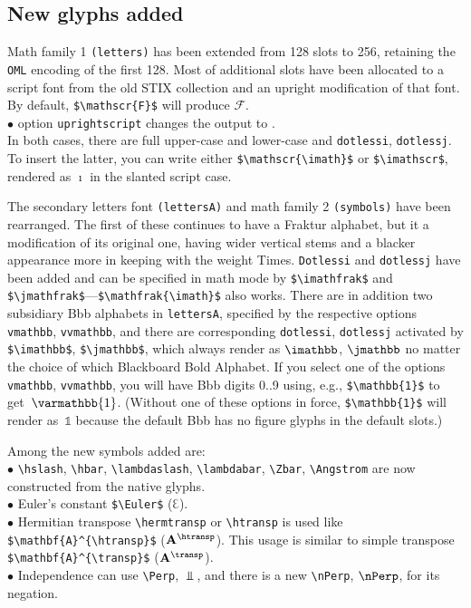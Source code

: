 \documentclass[11pt]{article}
\theoremstyle{oldplain}
\theoremstyle{plain}
\begin{document}
\subsection{New glyphs added}  Math family 1 {\tt (letters)} has been extended from 128 slots to 256, retaining the {\tt OML} encoding of the first 128. Most of additional slots have been allocated to a script font from the old STIX collection and an upright modification of that font.
By default, \verb|$\mathscr{F}$| will produce $\mathscr{F}$.\\
$\bullet$ option {\tt uprightscript} changes the output to {}.\\
In both cases, there are full upper-case and lower-case and {\tt dotlessi}, {\tt dotlessj}. To insert the latter, you can write either \verb|$\mathscr{\imath}$| or \verb|$\imathscr$|, rendered as $\mathscr{\imath}$ in the slanted script case.

The secondary letters font {\tt (lettersA)} and math family 2 {\tt(symbols)} have been rearranged. The first of these continues to have a Fraktur alphabet, but it a modification of its original one, having wider vertical stems and a blacker appearance more in keeping with the weight Times. {\tt Dotlessi} and {\tt dotlessj} have been added and can be specified in math mode by \verb|$\imathfrak$| and \verb|$\jmathfrak$|---\verb|$\mathfrak{\imath}$| also works. There are in addition two subsidiary Bbb alphabets in {\tt lettersA}, specified by the respective options {\tt vmathbb}, {\tt vvmathbb}, and there are corresponding {\tt dotlessi}, {\tt dotlessj} activated by \verb|$\imathbb$|, \verb|$\jmathbb$|, which always render as $\imathbb$, $\jmathbb$ no matter the choice of which Blackboard Bold Alphabet. If you select one of the options {\tt vmathbb}, {\tt vvmathbb}, you will have Bbb digits 0..9 using, e.g., \verb|$\mathbb{1}$| to get~$\varmathbb{1}$. (Without one of these options in force, \verb|$\mathbb{1}$| will render as~$\mathbb{1}$ because the default Bbb has no figure glyphs in the default slots.)

Among the new symbols added are:\\
$\bullet$ \verb|\hslash|, \verb|\hbar|, \verb|\lambdaslash|, \verb|\lambdabar|, \verb|\Zbar|, \verb|\Angstrom| are now constructed from the native glyphs.\\
$\bullet$ Euler's constant \verb|$\Euler$| ($\Euler$).\\
$\bullet$ Hermitian transpose \verb|\hermtransp| or \verb|\htransp| is used like \verb|$\mathbf{A}^{\htransp}$| ($\mathbf{A}^{\htransp}$). This usage is similar to simple transpose \verb|$\mathbf{A}^{\transp}$| ($\mathbf{A}^{\transp}$).\\
$\bullet$ Independence can use \verb|\Perp|, $\Perp$, and there is a new \verb|\nPerp|, $\nPerp$, for its negation.
\end{document}
